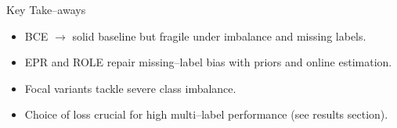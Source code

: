 

\begin{frame}{Key Take--aways}
\begin{itemize}
  \item BCE $\rightarrow{}$ solid baseline but fragile under imbalance and missing labels.
  \item EPR and ROLE repair missing--label bias with priors and online estimation.
  \item Focal variants tackle severe class imbalance.
  \item Choice of loss crucial for high multi--label performance (see results section).
\end{itemize}
\end{frame}


